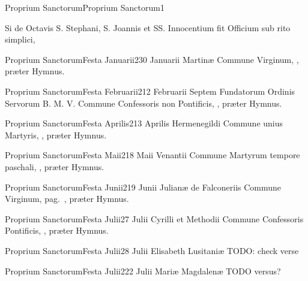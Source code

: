 \documentclass[psalterium-tridentinum.tex]{subfiles}
\begin{document}
	{Proprium Sanctorum}{Proprium Sanctorum}{1}{}{}{}{}{}{}


Si de Octavis S. Stephani, S. Joannis et SS. Innocentium fit Officium sub rito simplici, %


	{Proprium Sanctorum}{Festa Januarii}{2}{30 Januarii}
	{}{}{Martinæ}
	{Commune Virginum, \pageref{M-MU}, præter Hymnus.}
	{}

	{Proprium Sanctorum}{Festa Februarii}{2}{12 Februarii}
	{}{}{Septem Fundatorum Ordinis Servorum B. M. V.}
	{Commune Confessoris non Pontificis, \pageref{M-CONP}, præter Hymnus.}
	{}

	{Proprium Sanctorum}{Festa Aprilis}{2}{13 Aprilis}
	{}{}{Hermenegildi}
	{Commune unius Martyris, \pageref{M-UMEX}, præter Hymnus.}
	{}

	{Proprium Sanctorum}{Festa Maii}{2}{18 Maii}
	{}{}{Venantii}
	{Commune Martyrum tempore paschali, \pageref{M-MRTP}, præter Hymnus.}
	{}

	{Proprium Sanctorum}{Festa Junii}{2}{19 Junii}
	{}{}{Julianæ de Falconeriis}
	{Commune Virginum, pag.\ \pageref{M-MU}, præter Hymnus.}
	{}

	{Proprium Sanctorum}{Festa Julii}{2}{7 Julii}
	{}{}{Cyrilli et Methodii}
	{Commune Confessoris Pontificis, \pageref{M-COPO}, præter Hymnus.}
	{}

	{Proprium Sanctorum}{Festa Julii}{2}{8 Julii}
	{}{}{Elisabeth Lusitaniæ}
	{TODO: check verse}
	{}

	{Proprium Sanctorum}{Festa Julii}{2}{22 Julii}
	{}{}{Mariæ Magdalenæ}
	{TODO versus?}
	{}
\end{document}
